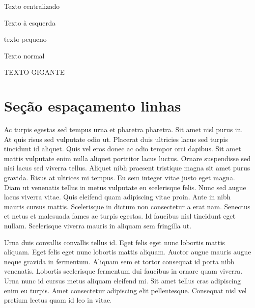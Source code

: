 \documentclass[12pt]{article}
\begin{document}
	\begin{center}
		Texto centralizado
	\end{center}
	
	\begin{flushleft}
		Texto à esquerda
	\end{flushleft}
	
	\begin{tiny}
		texto pequeno
	\end{tiny}
	
	Texto normal
	
	{\Huge TEXTO GIGANTE}
	
	\newpage
	
	\section{Seção espaçamento linhas}
		\doublespacing %
		Ac turpis egestas sed tempus urna et pharetra pharetra. Sit amet nisl purus in. At quis risus sed vulputate odio ut. Placerat duis ultricies lacus sed turpis tincidunt id aliquet. Quis vel eros donec ac odio tempor orci dapibus. Sit amet mattis vulputate enim nulla aliquet porttitor lacus luctus. Ornare suspendisse sed nisi lacus sed viverra tellus. Aliquet nibh praesent tristique magna sit amet purus gravida. Risus at ultrices mi tempus. Eu sem integer vitae justo eget magna. Diam ut venenatis tellus in metus vulputate eu scelerisque felis. Nunc sed augue lacus viverra vitae. Quis eleifend quam adipiscing vitae proin. Ante in nibh mauris cursus mattis. Scelerisque in dictum non consectetur a erat nam. Senectus et netus et malesuada fames ac turpis egestas. Id faucibus nisl tincidunt eget nullam. Scelerisque viverra mauris in aliquam sem fringilla ut.
		
		\begin{onehalfspace} %
			Urna duis convallis convallis tellus id. Eget felis eget nunc lobortis mattis aliquam. Eget felis eget nunc lobortis mattis aliquam. Auctor augue mauris augue neque gravida in fermentum. Aliquam sem et tortor consequat id porta nibh venenatis. Lobortis scelerisque fermentum dui faucibus in ornare quam viverra. Urna nunc id cursus metus aliquam eleifend mi. Sit amet tellus cras adipiscing enim eu turpis. Amet consectetur adipiscing elit pellentesque. Consequat nisl vel pretium lectus quam id leo in vitae.
		\end{onehalfspace}
	
\end{document}
